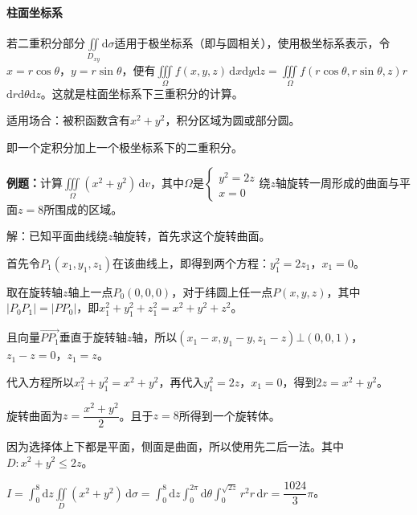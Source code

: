 \documentclass[UTF8, 12pt]{ctexart}
\begin{document}
        \paragraph{柱面坐标系} \leavevmode \medskip

        若二重积分部分$\iint\limits_{D_{xy}}\textrm{d}\sigma$适用于极坐标系（即与圆相关），使用极坐标系表示，令$x=r\cos\theta$，$y=r\sin\theta$，便有$\iiint\limits_\Omega f(x,y,z)\,\textrm{d}x\textrm{d}y\textrm{d}z=\iiint\limits_\Omega f(r\cos\theta,r\sin\theta,z)r\,$\\$\textrm{d}r\textrm{d}\theta\textrm{d}z$。这就是柱面坐标系下三重积分的计算。

        适用场合：被积函数含有$x^2+y^2$，积分区域为圆或部分圆。

        即一个定积分加上一个极坐标系下的二重积分。


        \textbf{例题：}计算$\iiint\limits_\Omega(x^2+y^2)\,\textrm{d}v$，其中$\Omega$是$\left\{\begin{array}{ll}
                                                                                                 y^2=2z \\
                                                                                                 x=0
        \end{array}\right.$绕$z$轴旋转一周形成的曲面与平面$z=8$所围成的区域。

        解：已知平面曲线绕$z$轴旋转，首先求这个旋转曲面。

        首先令$P_1(x_1,y_1,z_1)$在该曲线上，即得到两个方程：$y_1^2=2z_1$，$x_1=0$。

        取在旋转轴$z$轴上一点$P_0(0,0,0)$，对于纬圆上任一点$P(x,y,z)$，其中$\vert P_0P_1\vert=\vert PP_0\vert$，即$x_1^2+y_1^2+z_1^2=x^2+y^2+z^2$。

        且向量$\overrightarrow{PP_1}$垂直于旋转轴$z$轴，所以$(x_1-x,y_1-y,z_1-z)\bot(0,0,1)$，$z_1-z=0$，$z_1=z$。

        代入方程所以$x_1^2+y_1^2=x^2+y^2$，再代入$y_1^2=2z$，$x_1=0$，得到$2z=x^2+y^2$。

        旋转曲面为$z=\dfrac{x^2+y^2}{2}$。且于$z=8$所得到一个旋转体。

        因为选择体上下都是平面，侧面是曲面，所以使用先二后一法。其中$D:x^2+y^2\leqslant2z$。

        $I=\int_0^8\textrm{d}z\iint\limits_D(x^2+y^2)\,\textrm{d}\sigma=\int_0^8\textrm{d}z\int_0^{2\pi}\textrm{d}\theta\int_0^{\sqrt{2z}}r^2r\,\textrm{d}r=\dfrac{1024}{3}\pi$。
\end{document}
